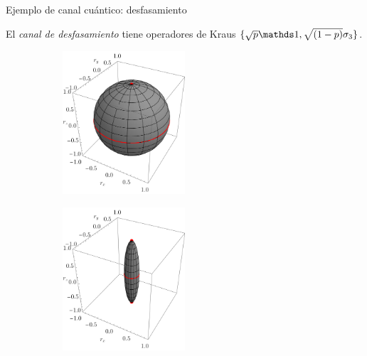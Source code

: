 \begin{frame}{Ejemplo de canal cuántico: desfasamiento}
    \begin{center}
        El \textit{canal de desfasamiento} tiene operadores de Kraus $\{\sqrt{p}\Id,\sqrt{(1-p)}\pauli{3}\}$.
    \end{center}
    \begin{figure}
        \centering
        \begin{subfigure}{0.45\textwidth}
            \centering
            \includegraphics[width=0.5\textwidth]{figures/whole_sphere.png}
        \end{subfigure}
        \begin{subfigure}{0.45\textwidth}
            \centering
            \includegraphics[width=0.5\textwidth]{figures/dephased.png}
        \end{subfigure}
    \end{figure}
\end{frame}
